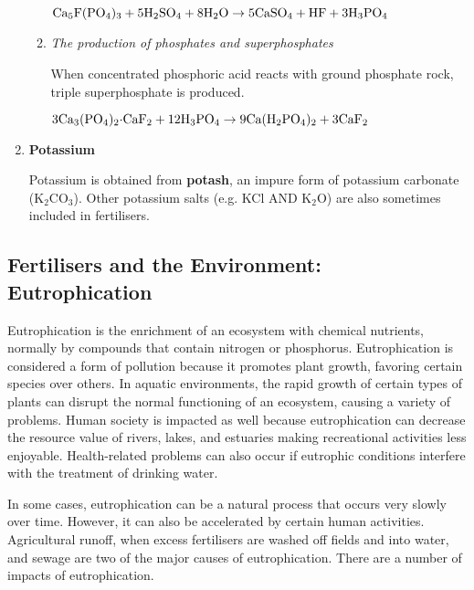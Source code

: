 \begin{enumerate}
\begin{enumerate}
\begin{center}
$\rm{Ca_{5}F(PO_{4})_{3} + 5H_{2}SO_{4} + 8H_{2}O \rightarrow 5CaSO_{4} + HF + 3H_{3}PO_{4}}$
\end{center} 

\item{\textit{The production of phosphates and superphosphates}}

When concentrated phosphoric acid reacts with ground phosphate rock, triple superphosphate is produced.

\begin{center}
$\rm{3Ca_{3}(PO_{4})_{2}{\cdot}CaF_{2} + 12H_{3}PO_{4} \rightarrow 9Ca(H_{2}PO_{4})_{2} + 3CaF_{2}}$ 
\end{center}
	\end{enumerate}

\item{\textbf{Potassium}}

Potassium is obtained from \textbf{potash}, an impure form of potassium carbonate (K$_{2}$CO$_{3}$). Other potassium salts (e.g. KCl AND K$_{2}$O) are also sometimes included in fertilisers.

\end{enumerate}

\subsection{Fertilisers and the Environment: Eutrophication}

Eutrophication is the enrichment of an ecosystem with chemical nutrients, normally by compounds that contain nitrogen or phosphorus. Eutrophication is considered a form of pollution because it promotes plant growth, favoring certain species over others. In aquatic environments, the rapid growth of  certain types of plants can disrupt the normal functioning of an ecosystem, causing a variety of problems. Human society is impacted as well because eutrophication can decrease the resource value of rivers, lakes, and estuaries making recreational activities less enjoyable. Health-related problems can also occur if eutrophic conditions interfere with the treatment of drinking water.


In some cases, eutrophication can be a natural process that occurs very slowly over time. However, it can also be accelerated by certain human activities. Agricultural runoff, when excess fertilisers are washed off fields and into water, and sewage are two of the major causes of eutrophication. There are a number of impacts of eutrophication.

